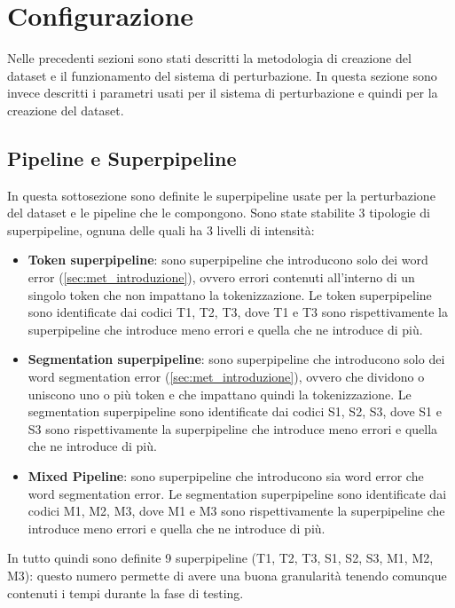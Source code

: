\section{Configurazione}
\label{dst:configurazione}
Nelle precedenti sezioni sono stati descritti la metodologia di creazione del dataset e il funzionamento del sistema di perturbazione. In questa sezione sono invece descritti i parametri usati per il sistema di perturbazione e quindi per la creazione del dataset.

\subsection{Pipeline e Superpipeline}
\label{sec:dst_pipsup}
In questa sottosezione sono definite le superpipeline usate per la perturbazione del dataset e le pipeline che le compongono. Sono state stabilite 3 tipologie di superpipeline, ognuna delle quali ha 3 livelli di intensità:

\begin{itemize}
\item \textbf{Token superpipeline}: sono superpipeline che introducono solo dei word error (\autoref{sec:met_introduzione}), ovvero errori contenuti all'interno di un singolo token che non impattano la tokenizzazione. Le token superpipeline sono identificate dai codici T1, T2, T3, dove T1 e T3 sono rispettivamente la superpipeline che introduce meno errori e quella che ne introduce di più.

\item \textbf{Segmentation superpipeline}: sono superpipeline che introducono solo dei word segmentation error (\autoref{sec:met_introduzione}), ovvero che dividono o uniscono uno o più token e che impattano quindi la tokenizzazione. Le segmentation superpipeline sono identificate dai codici S1, S2, S3, dove S1 e S3 sono rispettivamente la superpipeline che introduce meno errori e quella che ne introduce di più.

\item \textbf{Mixed Pipeline}: sono superpipeline che introducono sia word error che word segmentation error. Le segmentation superpipeline sono identificate dai codici M1, M2, M3, dove M1 e M3 sono rispettivamente la superpipeline che introduce meno errori e quella che ne introduce di più.
\end{itemize}

In tutto quindi sono definite 9 superpipeline (T1, T2, T3, S1, S2, S3, M1, M2, M3): questo numero permette di avere una buona granularità tenendo comunque contenuti i tempi durante la fase di testing.

